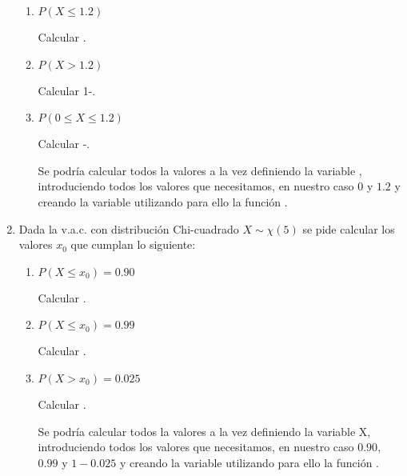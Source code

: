 \begin{enumerate}[leftmargin=*]
\begin{enumerate}
\item $P(X\leq 1.2)$
\begin{indicacion}
Calcular .
\end{indicacion}

\item $P(X>1.2)$
\begin{indicacion}
Calcular 1-.
\end{indicacion}

\item $P(0 \leq X \leq 1.2)$

\begin{indicacion}
Calcular -.
\end{indicacion}

\begin{indicacion}
Se podría calcular todos la valores a la vez definiendo la variable 
, introduciendo todos los valores que
necesitamos, en nuestro caso $0$ y $1.2$ y creando la variable 
 utilizando para ello la función
.
\end{indicacion}
\end{enumerate}


\item Dada la v.a.c. con distribución Chi-cuadrado $X\sim\chi(5)$ se 
pide calcular los valores $x_0$ que cumplan lo
siguiente:
\begin{enumerate}
\item $P(X\leq x_0)=0.90$
\begin{indicacion}
Calcular .
\end{indicacion}

\item $P(X\leq x_0)=0.99$
\begin{indicacion}
Calcular .
\end{indicacion}

\item $P(X> x_0)=0.025$
\begin{indicacion}
Calcular .
\end{indicacion}

\begin{indicacion}
Se podría calcular todos la valores a la vez definiendo la variable 
\textsf{X}, introduciendo todos los valores que
necesitamos, en nuestro caso $0.90$, $0.99$ y $1-0.025$ y creando 
la variable  utilizando para
ello la función .
\end{indicacion}
\end{enumerate}


\end{enumerate}
